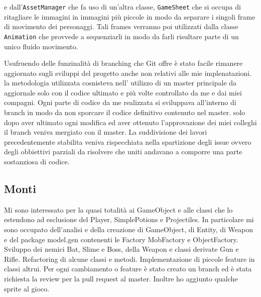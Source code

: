 \documentclass[a4paper,12pt]{report}
\begin{document}
    e dall’\texttt{AssetManager} che fa uso di un’altra classe, \texttt{GameSheet} che si occupa di ritagliare le immagini in immagini più piccole
    in modo da separare i singoli frame di movimento dei personaggi. Tali frames verranno poi utilizzati dalla classe \texttt{Animation} che
    provvede a sequenziarli in modo da farli risultare parte di un unico fluido movimento.
    \par Usufruendo delle funzinalità di branching che Git offre è stato facile rimanere aggiornato sugli sviluppi del progetto anche non
    relativi alle mie implenatazioni. la metodologia utilizzata cosnisteva nell' utilizzo di un master principale da aggiornale solo con
    il codice ultimato e più volte controllato da me e dai miei compagni. Ogni parte di codice da me realizzata si sviluppava all'interno di branch
    in modo da non sporcare il codice definitivo contenuto nel master. solo dopo aver ultimato ogni modifica ed aver ottenuto l'approvazione dei miei colleghi
    il branch veniva mergiato con il master.
    La suddivisione dei lavori precedentemente stabilita veniva rispecchiata nella spartizione degli issue ovvero degli obbiettivi parziali da risolvere che uniti
    andavano a comporre una parte sostanziosa di codice.
    \subsection{Monti}
    \par Mi sono interessato per la quasi totalità ai GameObject e alle classi che lo estendono ad esclusione del Player, SimplePotions e Projectiles.
    In particolare mi sono occupato dell'analisi e della creazione di GameObject, di Entity, di Weapon e del package model.gen contenenti le Factory MobFactory
    e ObjectFactory.
    Sviluppo dei nemici Bat, Slime e Boss, della Weapon e classi derivate Gun e Rifle.
    Refactoring di alcune classi e metodi. Implementazione di piccole feature in classi altrui.
    Per ogni cambiamento o feature è stato creato un branch ed è stata richiesta la review per la pull request al master.
    Inoltre ho aggiunto qualche sprite al gioco.
\end{document}
